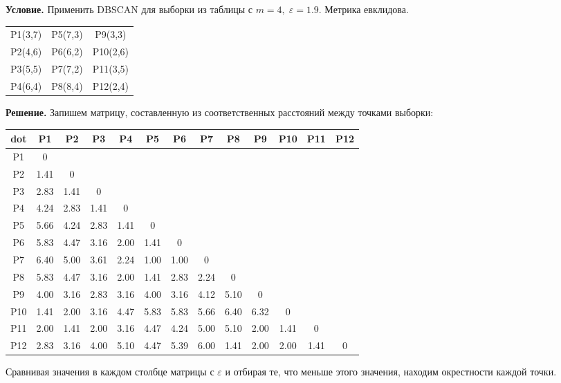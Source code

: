 \textbf{Условие.} Применить DBSCAN для выборки из таблицы с $m=4,\;\varepsilon=1.9$. Метрика евклидова.

\begin{center}
\begin{tabular}{ |c|c|c| } 
 \hline
 P1(3,7) & P5(7,3) & P9(3,3) \\ 
 P2(4,6) & P6(6,2) & P10(2,6) \\ 
 P3(5,5) & P7(7,2) & P11(3,5) \\ 
 P4(6,4) & P8(8,4) & P12(2,4) \\ 
 \hline
\end{tabular}
\end{center}

\textbf{Решение.}
Запишем матрицу, составленную из соответственных расстояний между точками выборки:
\begin{center}
\begin{tabular}{ |c|c|c|c|c|c|c|c|c|c|c|c|c|} 
 \hline
dot & P1 & P2 & P3 & P4 & P5 & P6 & P7 & P8 & P9 & P10 & P11 & P12 \\ \hline
P1 & 0 &  &  &  &  &  &  &  &  &  &  &   \\ \hline
P2 & 1.41 & 0 &  &  &  &  &  &  &  &  &  &   \\ \hline
P3 & 2.83 & 1.41 & 0 &  &  &  &  &  &  &  &  &   \\ \hline
P4 & 4.24 & 2.83 & 1.41 & 0 &  &  &  &  &  &  &  &   \\ \hline
P5 & 5.66 & 4.24 & 2.83 & 1.41 & 0 &  &  &  &  &  &  &   \\ \hline
P6 & 5.83 & 4.47 & 3.16 & 2.00 & 1.41 & 0 &  &  &  &  &  &   \\ \hline
P7 & 6.40 & 5.00 & 3.61 & 2.24 & 1.00 & 1.00 & 0 &  &  &  &  &   \\ \hline
P8 & 5.83 & 4.47 & 3.16 & 2.00 & 1.41 & 2.83 & 2.24 & 0 &  &  &  &   \\ \hline
P9 & 4.00 & 3.16 & 2.83 & 3.16 & 4.00 & 3.16 & 4.12 & 5.10 & 0 &  &  &   \\ \hline
P10& 1.41 & 2.00 & 3.16 & 4.47 & 5.83 & 5.83 & 5.66 & 6.40 & 6.32 & 0 &  &   \\ \hline
P11& 2.00 & 1.41 & 2.00 & 3.16 & 4.47 & 4.24 & 5.00 & 5.10 & 2.00 & 1.41 & 0 &   \\ \hline
P12& 2.83 & 3.16 & 4.00 & 5.10 & 4.47 & 5.39 & 6.00 & 1.41 & 2.00 & 2.00 & 1.41 & 0  \\ \hline
\end{tabular}
\end{center}
Сравнивая значения в каждом столбце матрицы с $\varepsilon$ и отбирая те, что меньше этого значения, находим окрестности каждой точки.

